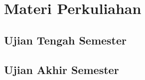 \documentclass[12pt,letterpaper]{book}
\begin{document}
\part{Materi Perkuliahan}








\chapter{Ujian Tengah Semester}




\chapter{Ujian Akhir Semester}
\end{document}

